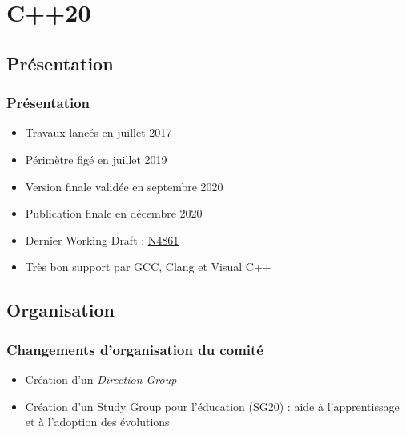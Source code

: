 \documentclass[C++.tex]{subfiles}
\begin{document}
\section{C++20}
\subsection*{Présentation}
\begin{frame}
	\frametitle{Présentation}
	\begin{itemize}
		\item Travaux lancés en juillet 2017
		\item Périmètre figé en juillet 2019
		\item Version finale validée en septembre 2020
		\item Publication finale en décembre 2020
		\item Dernier Working Draft : \href{https://github.com/cplusplus/draft/releases/download/n4861/n4861.pdf}{N4861}
		\item Très bon support par GCC, Clang et Visual C++
		
	\end{itemize}
\end{frame}

\subsection*{Organisation}
\begin{frame}
	\frametitle{Changements d'organisation du comité}
	\begin{itemize}
		\item Création d'un \textit{Direction Group}
		\item Création d'un Study Group pour l'éducation (SG20) : aide à l'apprentissage et à l'adoption des évolutions
	\end{itemize}

	\centering

\end{frame}
\end{document}
